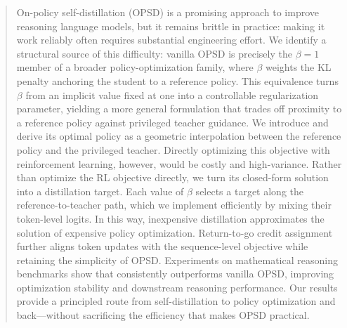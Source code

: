 
\begin{abstract}

On-policy self-distillation (OPSD) is a promising approach to improve reasoning language
models, but it remains brittle in practice: making it work reliably often requires substantial
engineering effort. We identify a structural source of this difficulty: vanilla OPSD is
precisely the $\beta=1$ member of a broader policy-optimization family, where $\beta$ weights
the KL penalty anchoring the student to a reference policy. This equivalence turns $\beta$ from an implicit value
fixed at one into a controllable regularization parameter, yielding a
more general formulation that trades off proximity to a reference policy against privileged
teacher guidance. We introduce \oursbold and derive its optimal policy as a geometric
interpolation between the reference policy and the privileged teacher. Directly optimizing
this objective with reinforcement learning, however, would be costly and high-variance.
Rather than optimize the RL objective directly, we turn its closed-form solution into a
distillation target. Each value of $\beta$ selects a target along the reference-to-teacher
path, which we implement efficiently by mixing their token-level logits. In this way,
inexpensive distillation approximates the solution of
expensive policy optimization. Return-to-go credit assignment further aligns token updates
with the sequence-level objective while retaining the simplicity of OPSD. Experiments on
mathematical reasoning benchmarks show that \ours{} consistently
outperforms vanilla OPSD, improving optimization stability and downstream reasoning
performance. Our results provide a principled route from self-distillation to policy
optimization and back---without sacrificing the efficiency that makes OPSD practical.

\end{abstract}
